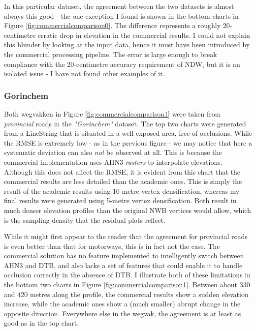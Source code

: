 In this particular dataset, the agreement between the two datasets is almost always this good - the one exception I found is shown in the bottom charts in Figure \ref{fig:commercialcomparison0}. The difference represents a roughly 20-centimetre erratic drop in elevation in the commercial results. I could not explain this blunder by looking at the input data, hence it must have been introduced by the commercial processing pipeline. The error is large enough to break compliance with the 20-centimetre accuracy requirement of NDW, but it is an isolated issue - I have not found other examples of it.

\subsubsection{Gorinchem}

Both wegvakken in Figure \ref{fig:commercialcomparison1} were taken from \textit{provincial} roads in the \textit{"Gorinchem"} dataset. The top two charts were generated from a LineString that is situated in a well-exposed area, free of occlusions. While the RMSE is extremely low - as in the previous figure - we may notice that here a systematic deviation can also \textit{not} be observed at all. This is because the commercial implementation uses AHN3 \textit{rasters} to interpolate elevations. Although this does not affect the RMSE, it is evident from this chart that the commercial results are less detailed than the academic ones. This is simply the result of the academic results using 10-metre vertex densification, whereas my final results were generated using 5-metre vertex densification. Both result in much denser elevation profiles than the original NWB vertices would allow, which is the sampling density that the residual plots reflect.

While it might first appear to the reader that the agreement for provincial roads is even better than that for motorways, this is in fact not the case. The commercial solution has no feature implemented to intelligently switch between AHN3 and DTB, and also lacks a set of features that could enable it to handle occlusion correctly in the absence of DTB. I illustrate both of these limitations in the bottom two charts in Figure \ref{fig:commercialcomparison1}. Between about 330 and 420 metres along the profile, the commercial results show a sudden elevation increase, while the academic ones show a (much smaller) abrupt change in the opposite direction. Everywhere else in the wegvak, the agreement is at least as good as in the top chart.

